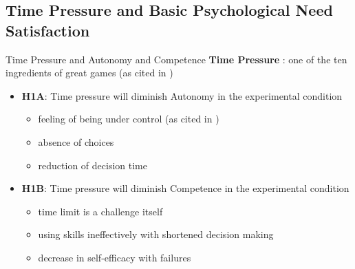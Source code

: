 \documentclass{beamer}
\begin{document}
\subsection{Time Pressure and Basic Psychological Need Satisfaction}
\begin{frame}{Time Pressure and Autonomy and Competence}
\textbf{Time Pressure} : one of the ten ingredients of great games (as cited in \cite{Deterding2011Gamification})
\begin{itemize}
	\item \textbf{H1A}: \alert{Time pressure will diminish Autonomy} in the  experimental condition
		\begin{itemize}
			\item feeling of being under control \cite{RyanDeci2000bSDT, RyanDeci2000IntrinsicExtrinsic, Radel2013NeedRestoration, hattie2007powerofFeedback} (as cited in \cite{Deci2000GoalPursuit, PrzybylskiRigbyRyan2006MotivationPullofGames})
			\item absence of choices
			\item reduction of decision time
		\end{itemize}
  \item \textbf{H1B}: \alert{Time pressure will diminish Competence} in the experimental condition
  \begin{itemize}
  		\item time limit is a challenge itself \cite{adams2013fundamentals, schell2014art, teh2013can, BlohmL2013Gamification}
		\item using skills ineffectively with shortened decision making \cite{romero2013time}
		\item decrease in self-efficacy with failures
	\end{itemize}
   \end{itemize}
\end{frame}
\end{document}
